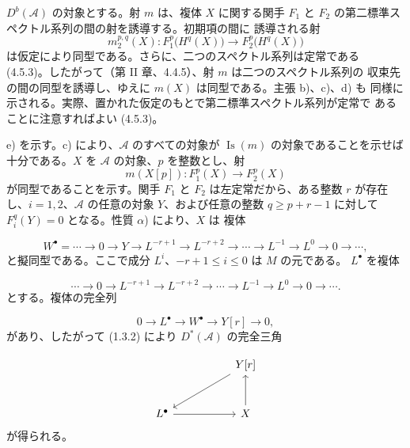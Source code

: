 \clearpage
{}%
\begingroup\small\setlength{\parskip}{0pt}\setlength{\emergencystretch}{1.5em}
\setlength{\abovedisplayskip}{4pt plus 2pt minus 2pt}%
\setlength{\belowdisplayskip}{4pt plus 2pt minus 2pt}%

\noindent $D^b(\mathcal A)$ の対象とする。射 $m$ は、複体 $X$ に関する関手
$F_1$ と $F_2$ の第二標準スペクトル系列の間の射を誘導する。初期項の間に
誘導される射
\[
m_2^{p,q}(X)\colon F_1^p\bigl(H^q(X)\bigr)
\longrightarrow F_2^p\bigl(H^q(X)\bigr)
\]
は仮定により同型である。さらに、二つのスペクトル系列は定常である
(4.5.3)。したがって（第 II 章、4.4.5）、射 $m$ は二つのスペクトル系列の
収束先の間の同型を誘導し、ゆえに $m(X)$ は同型である。主張 b)、c)、d) も
同様に示される。実際、置かれた仮定のもとで第二標準スペクトル系列が定常で
あることに注意すればよい (4.5.3)。

e) を示す。c) により、$\mathcal A$ のすべての対象が
$\operatorname{Is}(m)$ の対象であることを示せば十分である。$X$ を
$\mathcal A$ の対象、$p$ を整数とし、射
\[
m(X[p])\colon F_1^p(X)\longrightarrow F_2^p(X)
\]
が同型であることを示す。関手 $F_1$ と $F_2$ は左定常だから、ある整数
$r$ が存在し、$i=1,2$、$\mathcal A$ の任意の対象 $Y$、および任意の整数
$q\geq p+r-1$ に対して $F_i^q(Y)=0$ となる。性質 $\alpha$) により、$X$ は
複体

\[
W^\bullet=
\cdots\longrightarrow0\longrightarrow Y\longrightarrow L^{-r+1}
\longrightarrow L^{-r+2}\longrightarrow\cdots\longrightarrow L^{-1}
\longrightarrow L^0\longrightarrow0\longrightarrow\cdots,
\]
と擬同型である。ここで成分 $L^i$、$-r+1\leq i\leq0$ は $M$ の元である。
$L^\bullet$ を複体

\[
\cdots\longrightarrow0\longrightarrow L^{-r+1}
\longrightarrow L^{-r+2}\longrightarrow\cdots\longrightarrow L^{-1}
\longrightarrow L^0\longrightarrow0\longrightarrow\cdots.
\]
とする。複体の完全列

\[
0\longrightarrow L^\bullet\longrightarrow W^\bullet
\longrightarrow Y[r]\longrightarrow0,
\]
があり、したがって (1.3.2) により $D^*(\mathcal A)$ の完全三角

\[
\begin{tikzcd}[column sep=5.2em,row sep=2.8em]
{} & Y[r] \arrow[dl] \\
L^\bullet \arrow[r] & X \arrow[u]
\end{tikzcd}
\]
が得られる。
\endgroup
